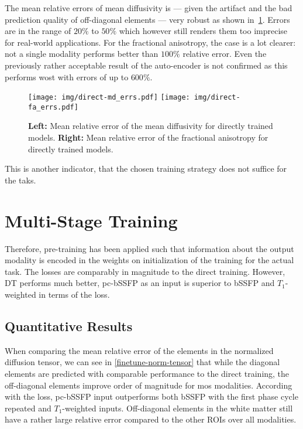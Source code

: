 The mean relative errors of mean diffusivity is --- given the artifact and the bad prediction quality of off-diagonal elements --- very robust as shown in~\ref{direct-mdfa}.
Errors are in the range of $20\%$ to $50\%$ which however still renders them too imprecise for real-world applications.
For the fractional anisotropy, the case is a lot clearer: not a single modality performs better than $100\%$ relative error.
Even the previously rather acceptable result of the auto-encoder is not confirmed as this performs wost with errors of up to $600\%$.
\begin{figure}[h]
   \begin{center}
      \texttt{[image: img/direct-md\_errs.pdf]}
      \texttt{[image: img/direct-fa\_errs.pdf]}
   \end{center}
   \caption{
      \textbf{Left:} Mean relative error of the mean diffusivity for directly trained models.
      \textbf{Right:} Mean relative error of the fractional anisotropy for directly trained models.
   }
   \label{direct-mdfa}
\end{figure}

This is another indicator, that the chosen training strategy does not suffice for the taks.

\section{Multi-Stage Training}
Therefore, pre-training has been applied such that information about the output modality is encoded in the weights on initialization of the training for the actual task.
The losses are comparably in magnitude to the direct training.
However, DT performs much better, pc-bSSFP as an input is superior to bSSFP and $T_1$-weighted in terms of the loss.


\subsection{Quantitative Results}
When comparing the mean relative error of the elements in the normalized diffusion tensor, we can see in \ref{finetune-norm-tensor} that while the diagonal elements are predicted with comparable performance to the direct training, the off-diagonal elements improve order of magnitude for mos modalities.
According with the loss, pc-bSSFP input outperforms both bSSFP with the first phase cycle repeated and $T_1$-weighted inputs.
Off-diagonal elements in the white matter still have a rather large relative error compared to the other ROIs over all modalities. \\

